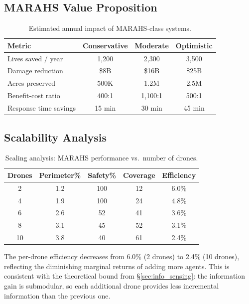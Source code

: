 \documentclass[12pt,a4paper]{article}
\begin{document}
\subsection{MARAHS Value Proposition}

\begin{table}[t]
\centering
\caption{Estimated annual impact of MARAHS-class systems.}
\label{tab:impact}
\begin{tabular}{lccc}
\toprule
\textbf{Metric} & \textbf{Conservative} & \textbf{Moderate} & \textbf{Optimistic} \\
\midrule
Lives saved / year     & 1,200   & 2,300   & 3,500   \\
Damage reduction       & \$8B    & \$16B   & \$25B   \\
Acres preserved        & 500K    & 1.2M    & 2.5M    \\
Benefit-cost ratio     & 400:1   & 1,100:1 & 500:1 \\
Response time savings  & 15 min  & 30 min  & 45 min  \\
\bottomrule
\end{tabular}
\end{table}

\subsection{Scalability Analysis}

\begin{table}[t]
\centering
\caption{Scaling analysis: MARAHS performance vs.\ number of drones.}
\label{tab:scaling}
\begin{tabular}{ccccc}
\toprule
\textbf{Drones} & \textbf{Perimeter\%} & \textbf{Safety\%} & \textbf{Coverage} & \textbf{Efficiency} \\
\midrule
2  & 1.2 & 100 & 12 & 6.0\% \\
4  & 1.9 & 100 & 24 & 4.8\% \\
6  & 2.6 & 52  & 41 & 3.6\% \\
8  & 3.1 & 45  & 52 & 3.1\% \\
10 & 3.8 & 40  & 61 & 2.4\% \\
\bottomrule
\end{tabular}
\end{table}

The per-drone efficiency decreases from 6.0\% (2 drones) to 2.4\% (10 drones), reflecting the diminishing marginal returns of adding more agents. This is consistent with the theoretical bound from \S\ref{sec:info_sensing}: the information gain is submodular, so each additional drone provides less incremental information than the previous one.
\end{document}
